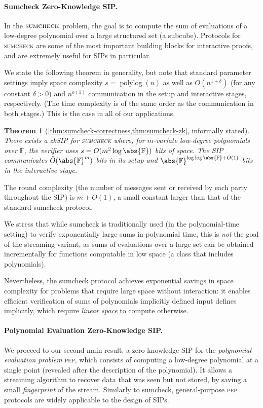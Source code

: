 \documentclass[10pt,a4paper]{article}
\newif\iflipics\lipicsfalse
\newtheorem{theorem}{Theorem}[section]
\theoremstyle{definition}
\newcommand{\zksip}{\textrm{zkSIP}}
\newcommand{\field}{\mathbb{F}}
\newcommand{\polylog}{\operatorname{polylog}}
\newcommand{\indexproblem}{\normalfont\textsc{index}\xspace}
\newcommand{\pep}{\normalfont\textsc{pep}\xspace}
\newcommand{\sumcheck}{\normalfont\textsc{sumcheck}\xspace}
\newcommand{\dimension}{m}
\begin{document}
\paragraph*{Sumcheck Zero-Knowledge SIP\iflipics\else.\fi}
In the $\sumcheck$ problem, the goal is to compute the sum of evaluations of a low-degree polynomial over a large structured set (a subcube). Protocols for \sumcheck are some of the most important building blocks for interactive proofs, and are extremely useful for SIPs in particular.

We state the following theorem in generality, but note that standard parameter settings imply space complexity $s = \polylog(n)$ as well as $O(n^{1 + \delta})$ (for any constant $\delta > 0$) and $n^{o(1)}$ communication in the setup and interactive stages, respectively. (The time complexity is of the same order as the communication in both stages.) This is the case in all of our applications.

\begin{theorem}[\cref{thm:sumcheck-correctness,thm:sumcheck-zk}, informally stated]
    \label{infthm:zk-sumcheck}
    There exists a \zksip{} for \sumcheck where, for $\dimension$-variate low-degree polynomials over $\field$, the verifier uses $s = O(\dimension^2 \log \abs{\field})$ bits of space. The SIP communicates $\tilde O(\abs{\field}^\dimension)$ bits in its setup and $\abs{\field}^{\log\log \abs{\field} + O(1)}$ bits in the interactive stage.
\end{theorem}

The round complexity (the number of messages sent or received by each party throughout the SIP) is $\dimension + O(1)$, a small constant larger than that of the standard sumcheck protocol.

We stress that while sumcheck is traditionally used (in the polynomial-time setting) to verify exponentially large sums in polynomial time, this is \emph{not} the goal of the streaming variant, as sums of evaluations over a large set can be obtained incrementally for functions computable in low space (a class that includes polynomials).

Nevertheless, the sumcheck protocol achieves exponential savings in space complexity for problems that require large space without interaction: it enables efficient verification of sums of polynomials implicitly defined  input defines implicitly, which require \emph{linear space} to compute otherwise.

\paragraph*{Polynomial Evaluation Zero-Knowledge SIP\iflipics\else.\fi}
We proceed to our second main result: a zero-knowledge SIP for the \emph{polynomial evaluation problem} \pep, which consists of computing a low-degree polynomial at a single point (revealed after the description of the polynomial). It allows a streaming algorithm to recover data that was seen but not stored, by saving a small \emph{fingerprint} of the stream.
Similarly to sumcheck, general-purpose \pep protocols are widely applicable to the design of SIPs.%
\end{document}

